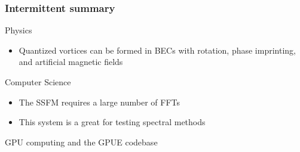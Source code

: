 \documentclass{beamer}
\begin{document}
\begin{frame}
\frametitle{Intermittent summary}
Physics
\begin{itemize}
\item Quantized vortices can be formed in BECs with rotation, phase imprinting, and artificial magnetic fields
\end{itemize}

\vspace{0.5cm}
\pause

Computer Science
\begin{itemize}
\item The SSFM requires a large number of FFTs
\item This system is a great for testing spectral methods
\end{itemize}

\end{frame}

\begin{frame}
\center \huge GPU computing and the GPUE codebase
\end{frame}
\end{document}
